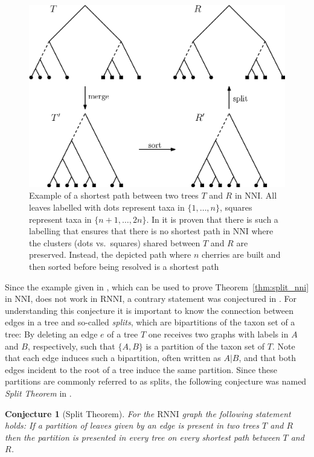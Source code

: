 \documentclass{amsart}
\newcommand{\nni}{\mathrm{NNI}}
\newcommand{\rnni}{\mathrm{RNNI}}
\newtheorem{conjecture}[definition]{Conjecture}
\begin{document}
\begin{figure}[H]
\centering
\includegraphics[width=.8\textwidth]{NNI_NP_proof}
\vspace{12pt}
\caption{Example of a shortest path between two trees $T$ and $R$ in $\nni$.
All leaves labelled with dots represent taxa in $\{1, \ldots, n\}$, squares represent taxa in $\{n+1, \ldots, 2n\}$.
In \autocite{Li1996-zw} it is proven that there is such a labelling that ensures that there is no shortest path in $\nni$ where the clusters (dots vs.\ squares) shared between $T$ and $R$ are preserved.
Instead, the depicted path where $n$ cherries are built and then sorted before being resolved is a shortest path}
\label{fig:NNI_NP_proof}
\end{figure}

Since the example given in \autocite{Li1996-zw}, which can be used to prove Theorem~\ref{thm:split_nni} in $\nni$, does not work in $\rnni$, a contrary statement was conjectured in \autocite{Gavryushkin2018-ol}.
For understanding this conjecture it is important to know the connection between edges in a tree and so-called \emph{splits}, which are bipartitions of the taxon set of a tree:
By deleting an edge $e$ of a tree $T$ one receives two graphs with labels in $A$ and $B$, respectively, such that $\{A,B\}$ is a partition of the taxon set of $T$.
Note that each edge induces such a bipartition, often written as $A|B$, and that both edges incident to the root of a tree induce the same partition.
Since these partitions are commonly referred to as splits, the following conjecture was named \emph{Split Theorem} in \autocite{Gavryushkin2018-ol}.

\begin{conjecture}[Split Theorem]
For the $\rnni$ graph the following statement holds:
If a partition of leaves given by an edge is present in two trees $T$ and $R$ then the partition is presented in every tree on every shortest path between $T$ and $R$.
\label{conjecture:split_theorem}
\end{conjecture}
\end{document}
